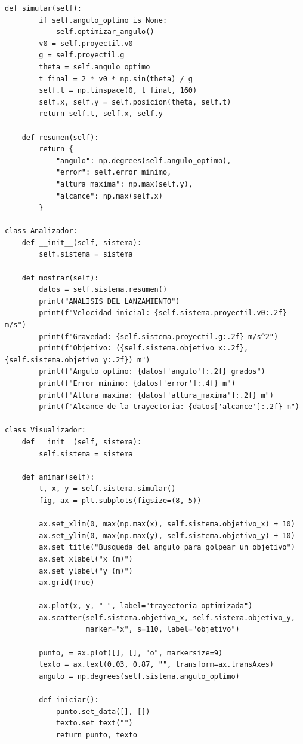 \documentclass[12pt,letterpaper]{article}
\begin{document}
\begin{lstlisting}[style=pythonstyle]
    def simular(self):
        if self.angulo_optimo is None:
            self.optimizar_angulo()
        v0 = self.proyectil.v0
        g = self.proyectil.g
        theta = self.angulo_optimo
        t_final = 2 * v0 * np.sin(theta) / g
        self.t = np.linspace(0, t_final, 160)
        self.x, self.y = self.posicion(theta, self.t)
        return self.t, self.x, self.y

    def resumen(self):
        return {
            "angulo": np.degrees(self.angulo_optimo),
            "error": self.error_minimo,
            "altura_maxima": np.max(self.y),
            "alcance": np.max(self.x)
        }

class Analizador:
    def __init__(self, sistema):
        self.sistema = sistema

    def mostrar(self):
        datos = self.sistema.resumen()
        print("ANALISIS DEL LANZAMIENTO")
        print(f"Velocidad inicial: {self.sistema.proyectil.v0:.2f} m/s")
        print(f"Gravedad: {self.sistema.proyectil.g:.2f} m/s^2")
        print(f"Objetivo: ({self.sistema.objetivo_x:.2f}, {self.sistema.objetivo_y:.2f}) m")
        print(f"Angulo optimo: {datos['angulo']:.2f} grados")
        print(f"Error minimo: {datos['error']:.4f} m")
        print(f"Altura maxima: {datos['altura_maxima']:.2f} m")
        print(f"Alcance de la trayectoria: {datos['alcance']:.2f} m")

class Visualizador:
    def __init__(self, sistema):
        self.sistema = sistema

    def animar(self):
        t, x, y = self.sistema.simular()
        fig, ax = plt.subplots(figsize=(8, 5))

        ax.set_xlim(0, max(np.max(x), self.sistema.objetivo_x) + 10)
        ax.set_ylim(0, max(np.max(y), self.sistema.objetivo_y) + 10)
        ax.set_title("Busqueda del angulo para golpear un objetivo")
        ax.set_xlabel("x (m)")
        ax.set_ylabel("y (m)")
        ax.grid(True)

        ax.plot(x, y, "-", label="trayectoria optimizada")
        ax.scatter(self.sistema.objetivo_x, self.sistema.objetivo_y,
                   marker="x", s=110, label="objetivo")

        punto, = ax.plot([], [], "o", markersize=9)
        texto = ax.text(0.03, 0.87, "", transform=ax.transAxes)
        angulo = np.degrees(self.sistema.angulo_optimo)

        def iniciar():
            punto.set_data([], [])
            texto.set_text("")
            return punto, texto


\end{lstlisting}
\end{document}
